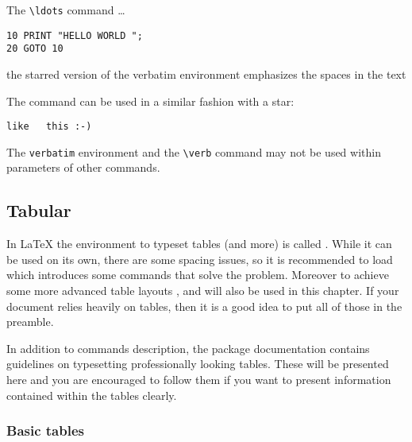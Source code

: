 \begin{example}
The \verb|\ldots| command \ldots

\begin{verbatim}
10 PRINT "HELLO WORLD ";
20 GOTO 10
\end{verbatim}
\end{example}

\begin{example}
\begin{verbatim*}
the starred version of
the      verbatim
environment emphasizes
the spaces   in the text
\end{verbatim*}
\end{example}

The  command can be used in a similar fashion with a star:

\begin{example}
\verb*|like   this :-) |
\end{example}

The \texttt{verbatim} environment and the \verb|\verb| command may not be used
within parameters of other commands.


\subsection{Tabular}

In \LaTeX{} the environment to typeset tables (and more) is called
. While it can be used on its own, there are some spacing issues,
so it is recommended to load  which introduces some commands
that solve the problem. Moreover to achieve some more advanced table layouts
,  and  will also be used in this
chapter. If your document relies heavily on tables, then it is a good idea to
put all of those in the preamble.

In addition to commands description, the  package documentation
contains guidelines on typesetting professionally looking tables. These will be
presented here and you are encouraged to follow them if you want to present
information contained within the tables clearly.

\subsubsection{Basic tables} \label{foo}

